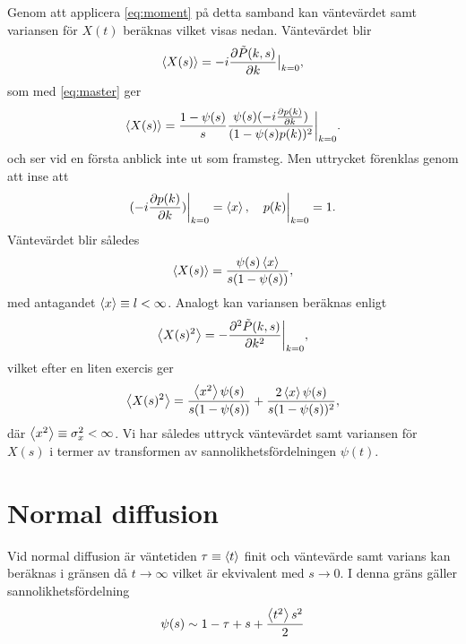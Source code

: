 Genom att applicera \eqref{eq:moment} på detta samband kan väntevärdet samt variansen för $X(t)$ beräknas vilket visas nedan. Väntevärdet blir 
\begin{equation}
\ev{X(s)} = -i\frac{\pd \tilde{P}(k,s)}{\pd k}\big |_{k=0},
\end{equation}
som med \eqref{eq:master} ger 
\begin{equation}
\ev{X(s)} = \frac{1-\psi(s)}{s}\frac{\psi(s)(-i\frac{\pd p(k)}{\pd k})}{(1-\psi(s)p(k))^2}\bigg |_{k=0}.
\end{equation}
och ser vid en första anblick inte ut som framsteg. Men uttrycket förenklas genom att inse att 
\begin{equation}
(-i\frac{\pd p(k)}{\pd k})\bigg |_{k=0} = \ev{x}, \quad p(k)\bigg |_{k=0} = 1. 
\end{equation}
Väntevärdet blir således 
\begin{equation}\label{eq:medel}
\ev{X(s)} = \frac{\psi(s)\ev{x}}{s(1-\psi(s))},
\end{equation}
med antagandet $\ev{x}\equiv l< \infty$. Analogt kan variansen beräknas enligt 
\begin{equation}
\ev{X(s)^2} = -\frac{\pd^2 \tilde{P}(k,s)}{\pd k^2}\bigg |_{k=0},
\end{equation}
vilket efter en liten exercis ger 
\begin{equation}\label{eq:var}
\ev{X(s)^2} = \frac{\ev{x^2}\psi(s)}{s(1-\psi(s))}+\frac{2\ev{x}\psi(s)}{s(1-\psi(s))^2},
\end{equation}
där $\ev{x^2}\equiv \sigma_x^2< \infty$. Vi har således uttryck väntevärdet samt variansen för $X(s)$ i termer av transformen av sannolikhetsfördelningen $\psi(t)$. 

\section{Normal diffusion}
Vid normal diffusion är väntetiden $\tau\equiv\ev{t}$ finit och väntevärde samt varians kan beräknas i gränsen då $t\to\infty$ vilket är ekvivalent med $s\to0$. I denna gräns gäller sannolikhetsfördelning 
\begin{equation}
\psi(s) \sim 1-\tau+s+\frac{\ev{t^2}s^2}{2} 
\end{equation}

